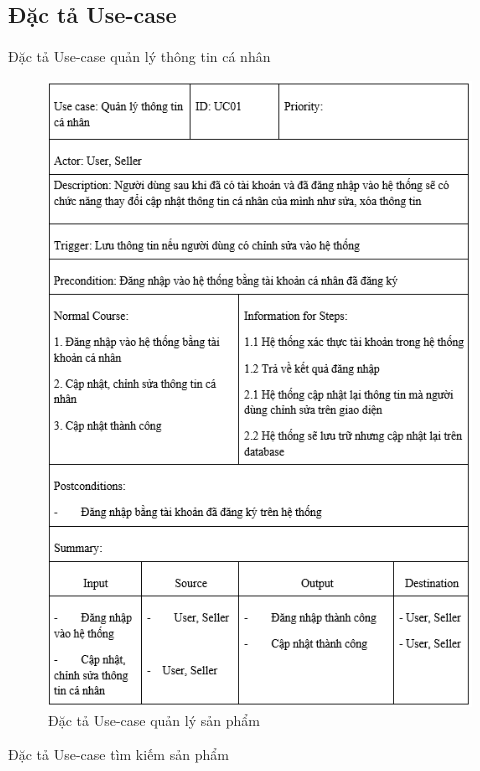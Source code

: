 \documentclass{article}
\begin{document}
\subsection{Đặc tả Use-case}\newpage
{\large Đặc tả Use-case quản lý thông tin cá nhân
	
	\begin{center}
		\begin{figure}[htp]
			\begin{center}
				\includegraphics[scale=.870]{anh10.png}
			\end{center}
			\caption{Đặc tả Use-case quản lý sản phẩm}
			
		\end{figure}
	\end{center}
\newpage
{\large Đặc tả Use-case tìm kiếm sản phẩm
	
}}
\end{document}
